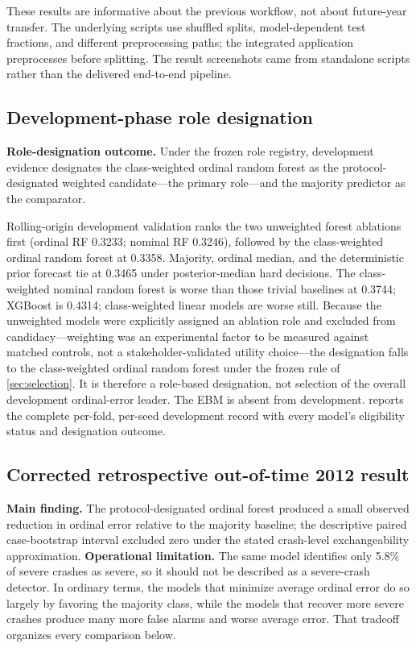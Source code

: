 \documentclass[11pt,letterpaper]{article}
\newcommand{\ORF}{ordinal random forest}
\begin{document}
These results are informative about the previous workflow, not about future-year transfer. The underlying scripts use shuffled splits, model-dependent test fractions, and different preprocessing paths; the integrated application preprocesses before splitting. The result screenshots came from standalone scripts rather than the delivered end-to-end pipeline.

\subsection{Development-phase role designation}
\label{sec:dev-selection}
\textbf{Role-designation outcome.} Under the frozen role registry, development evidence designates the class-weighted \ORF{} as the protocol-designated weighted candidate---the primary role---and the majority predictor as the comparator.

Rolling-origin development validation ranks the two unweighted forest ablations first (ordinal RF 0.3233; nominal RF 0.3246), followed by the class-weighted \ORF{} at 0.3358. Majority, ordinal median, and the deterministic prior forecast tie at 0.3465 under posterior-median hard decisions. The class-weighted nominal random forest is worse than those trivial baselines at 0.3744; XGBoost is 0.4314; class-weighted linear models are worse still. Because the unweighted models were explicitly assigned an ablation role and excluded from candidacy---weighting was an experimental factor to be measured against matched controls, not a stakeholder-validated utility choice---the designation falls to the class-weighted \ORF{} under the frozen rule of \cref{sec:selection}. It is therefore a role-based designation, not selection of the overall development ordinal-error leader. The EBM is absent from development.  reports the complete per-fold, per-seed development record with every model's eligibility status and designation outcome.

\subsection{Corrected retrospective out-of-time 2012 result}
\textbf{Main finding.} The protocol-designated ordinal forest produced a small observed reduction in ordinal error relative to the majority baseline; the descriptive paired case-bootstrap interval excluded zero under the stated crash-level exchangeability approximation. \textbf{Operational limitation.} The same model identifies only 5.8\% of severe crashes as severe, so it should not be described as a severe-crash detector. In ordinary terms, the models that minimize average ordinal error do so largely by favoring the majority class, while the models that recover more severe crashes produce many more false alarms and worse average error. That tradeoff organizes every comparison below.
\end{document}
